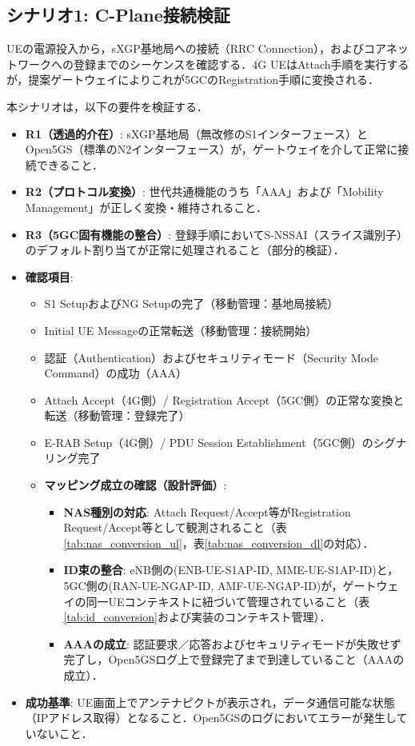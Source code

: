 \subsection{シナリオ1: C-Plane接続検証}
UEの電源投入から，sXGP基地局への接続（RRC Connection），およびコアネットワークへの登録までのシーケンスを確認する．4G UEはAttach手順を実行するが，提案ゲートウェイによりこれが5GCのRegistration手順に変換される．

本シナリオは，以下の要件を検証する．
\begin{itemize}
    \item \textbf{R1（透過的介在）}: sXGP基地局（無改修のS1インターフェース）とOpen5GS（標準のN2インターフェース）が，ゲートウェイを介して正常に接続できること．
    \item \textbf{R2（プロトコル変換）}: 世代共通機能のうち「AAA」および「Mobility Management」が正しく変換・維持されること．
    \item \textbf{R3（5GC固有機能の整合）}: 登録手順においてS-NSSAI（スライス識別子）のデフォルト割り当てが正常に処理されること（部分的検証）．
\end{itemize}
\begin{itemize}
    \item \textbf{確認項目}:
    \begin{itemize}
        \item S1 SetupおよびNG Setupの完了（移動管理：基地局接続）
        \item Initial UE Messageの正常転送（移動管理：接続開始）
        \item 認証（Authentication）およびセキュリティモード（Security Mode Command）の成功（AAA）
        \item Attach Accept（4G側）/ Registration Accept（5GC側）の正常な変換と転送（移動管理：登録完了）
        \item E-RAB Setup（4G側）/ PDU Session Establishment（5GC側）のシグナリング完了
        \item \textbf{マッピング成立の確認（設計評価）}:
        \begin{itemize}
            \item \textbf{NAS種別の対応}: Attach Request/\allowbreak Accept等がRegistration Request/\allowbreak Accept等として観測されること（表\ref{tab:nas_conversion_ul}，表\ref{tab:nas_conversion_dl}の対応）．
            \item \textbf{ID束の整合}: eNB側の(ENB-UE-S1AP-ID, MME-UE-S1AP-ID)と，5GC側の(RAN-UE-NGAP-ID, AMF-UE-NGAP-ID)が，ゲートウェイの同一UEコンテキストに紐づいて管理されていること（表\ref{tab:id_conversion}および実装のコンテキスト管理）．
            \item \textbf{AAAの成立}: 認証要求／応答およびセキュリティモードが失敗せず完了し，Open5GSログ上で登録完了まで到達していること（AAAの成立）．
        \end{itemize}
    \end{itemize}
    \item \textbf{成功基準}: UE画面上でアンテナピクトが表示され，データ通信可能な状態（IPアドレス取得）となること．Open5GSのログにおいてエラーが発生していないこと．
\end{itemize}

